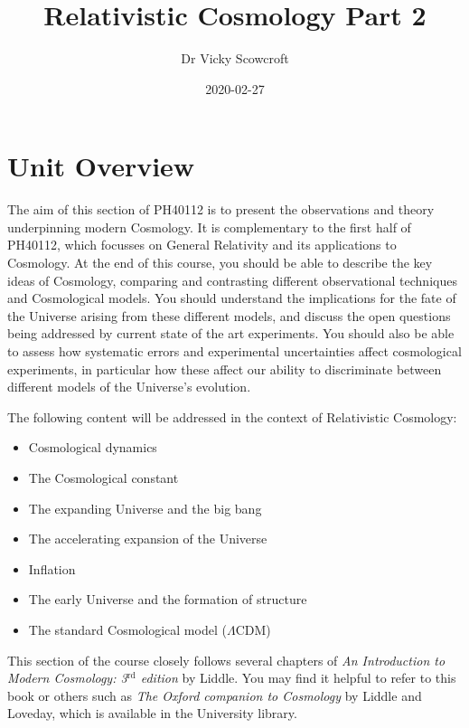 \documentclass[11pt,a4paper,notoc]{tufte-handout}
\title{Relativistic Cosmology Part 2}
\author{Dr Vicky Scowcroft}
\date{2020-02-27}
\begin{document}
\maketitle

{
\hypersetup{linkcolor=black}
\setcounter{tocdepth}{2}
\tableofcontents
}
\hypertarget{unit-overview}{%
\section*{Unit Overview}\label{unit-overview}}

The aim of this section of PH40112 is to present the observations and
theory underpinning modern Cosmology. It is complementary to the first
half of PH40112, which focusses on General Relativity and its
applications to Cosmology. At the end of this course, you should be
able to describe the key ideas of Cosmology, comparing and contrasting
different observational techniques and Cosmological models. You should
understand the implications for the fate of the Universe arising from
these different models, and discuss the open questions being addressed
by current state of the art experiments. You should also be able to
assess how systematic errors and experimental uncertainties affect
cosmological experiments, in particular how these affect our ability
to discriminate between different models of the Universe's evolution.

The following content will be addressed in the context of Relativistic
Cosmology:

\begin{itemize}
\item
  Cosmological dynamics
\item
  The Cosmological constant
\item
  The expanding Universe and the big bang
\item
  The accelerating expansion of the Universe
\item
  Inflation
\item
  The early Universe and the formation of structure
\item
  The standard Cosmological model (\(\Lambda\)CDM)
\end{itemize}

This section of the course closely follows several chapters of \emph{An
Introduction to Modern Cosmology: 3\(^{\text{rd}}\) edition} by Liddle.
You may find it helpful to refer to this book or others such as \emph{The
Oxford companion to Cosmology} by Liddle and Loveday, which is
available in the University library.
\end{document}
